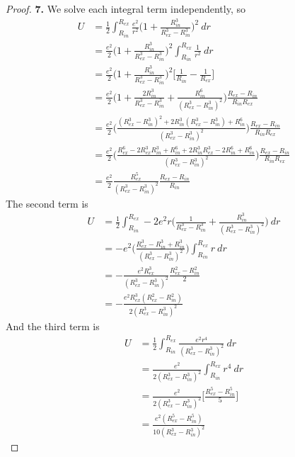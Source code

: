 \documentclass[11pt]{article}
\theoremstyle{definition}
\begin{document}
\begin{proof}{\textbf{7.}}
We solve each integral term independently, so
\begin{align*}
    U &= \frac{1}{2}\int_{R_{in}}^{R_{ex}}
    \frac{e^2}{r^2}\bigg(1 + \frac{R_{in}^3}{R_{ex}^3 - R_{in}^3}\bigg)^2~dr\\
    &= \frac{e^2}{2}\bigg(1 + \frac{R_{in}^3}{R_{ex}^3 - R_{in}^3}\bigg)^2
    \int_{R_{in}}^{R_{ex}} \frac{1}{r^2}~dr\\
    &= \frac{e^2}{2}\bigg(1 + \frac{R_{in}^3}{R_{ex}^3 - R_{in}^3}\bigg)^2
    \bigg[\frac{1}{R_{in}} -\frac{1}{R_{ex}}\bigg]\\
    &= \frac{e^2}{2}\bigg(1 + \frac{2R_{in}^3}{R_{ex}^3 - R_{in}^3}
    + \frac{R_{in}^6}{(R_{ex}^3 - R_{in}^3)^2}\bigg)
    \frac{R_{ex} - R_{in}}{R_{in}R_{ex}}\\
    &= \frac{e^2}{2}\bigg(
    \frac{(R_{ex}^3 - R_{in}^3)^2 + 2R_{in}^3(R_{ex}^3 - R_{in}^3) + R_{in}^6}
    {(R_{ex}^3 - R_{in}^3)^2}\bigg)
    \frac{R_{ex} - R_{in}}{R_{in}R_{ex}}\\
    &= \frac{e^2}{2}\bigg(
    \frac{R_{ex}^6 - 2R_{ex}^3R_{in}^3 + R_{in}^6
    + 2R_{in}^3R_{ex}^3 - 2R_{in}^6 + R_{in}^6}
    {(R_{ex}^3 - R_{in}^3)^2}\bigg)
    \frac{R_{ex} - R_{in}}{R_{in}R_{ex}}\\
    &= \frac{e^2}{2}\frac{R_{ex}^5}{(R_{ex}^3 - R_{in}^3)^2}
    \frac{R_{ex} - R_{in}}{R_{in}}
\end{align*}
The second term is
\begin{align*}
    U &= \frac{1}{2}\int_{R_{in}}^{R_{ex}}
    - 2e^2r\bigg(\frac{1}{R_{ex}^3 - R_{in}^3}
    + \frac{R_{in}^3}{(R_{ex}^3 - R_{in}^3)^2}\bigg)~dr\\
    &= -e^2\bigg(\frac{R_{ex}^3 - R_{in}^3 + R_{in}^3}{(R_{ex}^3 - R_{in}^3)^2}\bigg)
    \int_{R_{in}}^{R_{ex}} r~dr\\
    &= -\frac{e^2R_{ex}^3}{(R_{ex}^3 - R_{in}^3)^2}\frac{R_{ex}^2 - R_{in}^2}{2}\\
    &= -\frac{e^2R_{ex}^3(R_{ex}^2 - R_{in}^2)}{2(R_{ex}^3 - R_{in}^3)^2}
\end{align*}
And the third term is
\begin{align*}
    U &= \frac{1}{2}\int_{R_{in}}^{R_{ex}}
    \frac{e^2r^4}{(R_{ex}^3 - R_{in}^3)^2}~dr\\
    &= \frac{e^2}{2(R_{ex}^3 - R_{in}^3)^2}\int_{R_{in}}^{R_{ex}} r^4~dr\\
    &= \frac{e^2}{2(R_{ex}^3 - R_{in}^3)^2} \bigg[\frac{R_{ex}^5 - R_{in}^5}{5}\bigg]\\
    &= \frac{e^2(R_{ex}^5 - R_{in}^5)}{10(R_{ex}^3 - R_{in}^3)^2}

\end{align*}
\end{proof}
\end{document}
